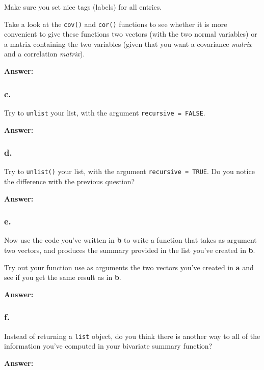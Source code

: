 \documentclass[]{article}
\begin{document}
Make sure you set nice tags (labels) for all entries.

Take a look at the \texttt{cov()} and \texttt{cor()} functions to see
whether it is more convenient to give these functions two vectors (with
the two normal variables) or a matrix containing the two variables
(given that you want a covariance \emph{matrix} and a correlation
\emph{matrix}).

\textbf{Answer:}

\hypertarget{c.-1}{%
\subsubsection{c.}\label{c.-1}}

Try to \texttt{unlist} your list, with the argument
\texttt{recursive\ =\ FALSE}.

\textbf{Answer:}

\hypertarget{d.-1}{%
\subsubsection{d.}\label{d.-1}}

Try to \texttt{unlist()} your list, with the argument
\texttt{recursive\ =\ TRUE}. Do you notice the difference with the
previous question?

\textbf{Answer:}

\hypertarget{e.-1}{%
\subsubsection{e.}\label{e.-1}}

Now use the code you've written in \textbf{b} to write a function that
takes as argument two vectors, and produces the summary provided in the
list you've created in \textbf{b}.

Try out your function use as arguments the two vectors you've created in
\textbf{a} and see if you get the same result as in \textbf{b}.

\textbf{Answer:}

\hypertarget{f.}{%
\subsubsection{f.}\label{f.}}

Instead of returning a \texttt{list} object, do you think there is
another way to all of the information you've computed in your bivariate
summary function?

\textbf{Answer:}
\end{document}
